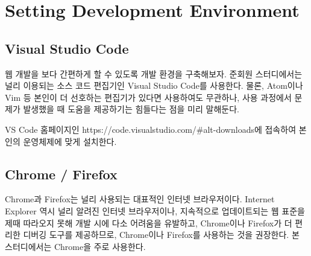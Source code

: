 \section{Setting Development Environment} \label{sect:setting-development-environment}

\subsection*{Visual Studio Code}
웹 개발을 보다 간편하게 할 수 있도록 개발 환경을 구축해보자. 준회원 스터디에서는 널리 이용되는 소스 코드 편집기인 Visual Studio Code를 사용한다. 물론, Atom이나 Vim 등 본인이 더 선호하는 편집기가 있다면 사용하여도 무관하나, 사용 과정에서 문제가 발생했을 때 도움을 제공하기는 힘들다는 점을 미리 말해둔다.

VS Code 홈페이지인 https://code.visualstudio.com/\#alt-downloads에 접속하여 본인의 운영체제에 맞게 설치한다. 

\subsection*{Chrome / Firefox}
Chrome과 Firefox는 널리 사용되는 대표적인 인터넷 브라우저이다. Internet Explorer 역시 널리 알려진 인터넷 브라우저이나, 지속적으로 업데이트되는 웹 표준을 제때 따라오지 못해 개발 시에 다소 어려움을 유발하고, Chrome이나 Firefox가 더 편리한 디버깅 도구를 제공하므로, Chrome이나 Firefox를 사용하는 것을 권장한다. 본 스터디에서는 Chrome을 주로 사용한다. 
